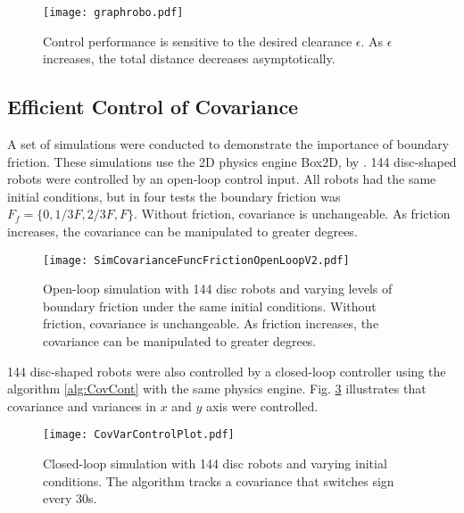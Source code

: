 \begin{figure}
\begin{center}
	\texttt{[image: graphrobo.pdf]}
\end{center}
\caption{\label{fig:graphrobo.pdf}
Control performance is sensitive to the desired clearance $\epsilon$.  As $\epsilon$ increases, the total distance decreases asymptotically.
}
\end{figure}

\subsection{Efficient Control of Covariance}
A set of simulations were conducted to demonstrate the importance of boundary friction.  These simulations use  the 2D physics engine Box2D, by \citet{catto2010box2d}.
 144 disc-shaped robots were controlled by an open-loop control input.  All robots had  the same initial conditions, but in four tests the boundary friction was $F_f = \{0,1/3 F, 2/3F, F\}$.
 Without friction, covariance is unchangeable.  As friction increases, the covariance can be manipulated to greater degrees.


\begin{figure}
\begin{center}
	\texttt{[image: SimCovarianceFuncFrictionOpenLoopV2.pdf]}
\end{center}
\caption{\label{fig:SimCovarianceFuncFrictionOpenLoop}
Open-loop simulation with 144 disc robots and varying levels of boundary friction under the same initial conditions.  Without friction, covariance is unchangeable.  As friction increases, the covariance can be manipulated to greater degrees.
}
\end{figure}

 144 disc-shaped robots were also controlled by a closed-loop controller using the algorithm \ref{alg:CovCont} with the same physics engine. Fig. \ref{fig:CovVarControlPlot} illustrates that covariance and variances in $x$ and $y$ axis were controlled.
\begin{figure}
\begin{center}
	\texttt{[image: CovVarControlPlot.pdf]}
\end{center}
\caption{\label{fig:CovVarControlPlot}
Closed-loop simulation with 144 disc robots and varying  initial conditions.  The algorithm tracks a covariance that switches sign every 30s.}
\end{figure}

